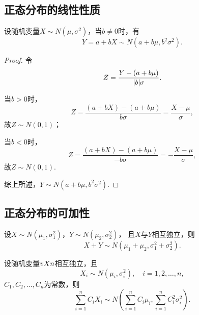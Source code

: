 \subsection{正态分布的线性性质}
\begin{theorem}\label{theorem:正态分布与自然指数分布族.正态分布的线性性质}
设随机变量\(X \sim N(\mu,\sigma^2)\)，当\(b \neq 0\)时，有\begin{equation}
Y = a+bX \sim N(a+b\mu,b^2\sigma^2).
\end{equation}
\begin{proof}
令\[
Z = \frac{Y-(a+b\mu)}{\abs{b}\sigma}.
\]

当\(b > 0\)时，\[
Z = \frac{(a+bX)-(a+b\mu)}{b\sigma}=\frac{X-\mu}{\sigma},
\]故\(Z \sim N(0,1)\)；

当\(b < 0\)时，\[
Z = \frac{(a+bX)-(a+b\mu)}{-b\sigma}=-\frac{X-\mu}{\sigma},
\]故\(Z \sim N(0,1)\).

综上所述，\(Y \sim N(a+b\mu,b^2\sigma^2)\).
\end{proof}
\end{theorem}

\subsection{正态分布的可加性}
\begin{theorem}\label{theorem:正态分布与自然指数分布族.正态分布的可加性1}
设\(X \sim N(\mu_1,\sigma_1^2)\)，\(Y \sim N(\mu_2,\sigma_2^2)\)，%
且\(X\)与\(Y\)相互独立，则\begin{equation}
X+Y \sim N(\mu_1+\mu_2,\sigma_1^2+\sigma_2^2).
\end{equation}
\end{theorem}

\begin{corollary}\label{theorem:正态分布与自然指数分布族.正态分布的可加性2}
设随机变量\(v{X}{n}\)相互独立，且\[
X_i \sim N(\mu_i,\sigma_i^2),
\quad i=1,2,\dotsc,n,
\]\(C_1,C_2,\dotsc,C_n\)为常数，则\begin{equation}
\sum\limits_{i=1}^n {C_i X_i}
\sim N\left(
\sum\limits_{i=1}^n {C_i \mu_i},
\sum\limits_{i=1}^n {C_i^2 \sigma_i^2}
\right).
\end{equation}
\end{corollary}

